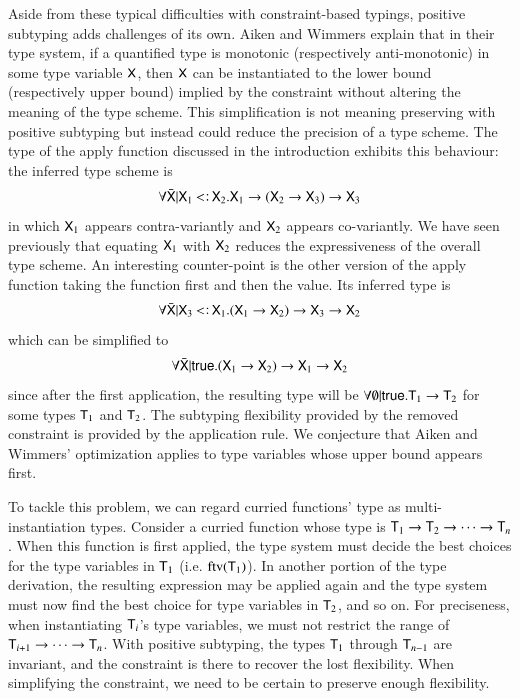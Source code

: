 \documentclass{report}
\begin{document}
  Aside from these typical difficulties with constraint-based typings, positive
  subtyping adds challenges of its own. Aiken and Wimmers \cite{aiken:ticti}
  explain that in their type system, if a quantified type is monotonic
  (respectively anti-monotonic) in some type variable $\textsf{X}$, then
  $\textsf{X}$ can be instantiated to the lower bound (respectively upper bound)
  implied by the constraint without altering the meaning of the type scheme.
  This simplification is not meaning preserving with positive subtyping but
  instead could reduce the precision of a type scheme. The type of the
  apply function discussed in the introduction exhibits this behaviour:
  the inferred type scheme is
  \begin{displaymath}
    \forall\bar{\type{X}}|\type{X}_1\subtype\type{X}_2.\type{X}_1\fun(\type{X}_2\fun\type{X}_3)\fun\type{X}_3
  \end{displaymath}
  in which $\textsf{X}_1$ appears contra-variantly and $\textsf{X}_2$ appears co-variantly.
  We have seen previously that equating $\textsf{X}_1$ with $\textsf{X}_2$
  reduces the expressiveness of the overall type scheme. An interesting counter-point is the
  other version of the apply function taking the function first and then the value.
  Its inferred type is
  \begin{displaymath}
    \forall\bar{\type{X}}|\type{X}_3\subtype\type{X}_1.(\type{X}_1\fun\type{X}_2)\fun\type{X}_3\fun\type{X}_2
  \end{displaymath}
  which can be simplified to
  \begin{displaymath}
    \forall\bar{\textsf{X}}|\textsf{true}.(\textsf{X}_1\rightarrow\textsf{X}_2)\rightarrow\textsf{X}_1\rightarrow\textsf{X}_2
  \end{displaymath}
  since after the first application, the resulting type will be
  $\forall\emptyset|\textsf{true}.\textsf{T}_1\rightarrow\textsf{T}_2$ for some types $\textsf{T}_1$ and
  $\textsf{T}_2$. The subtyping flexibility provided by the removed constraint
  is provided by the application rule. We conjecture that Aiken and Wimmers' optimization applies
  to type variables whose upper bound appears first.
  
  To tackle this problem, we can regard curried functions' type as multi-instantiation types.
  Consider a curried function whose type is $\textsf{T}_1\rightarrow\textsf{T}_2\rightarrow\cdots\rightarrow\textsf{T}_n$.
  When this function is first applied, the type system must decide
  the best choices for the type variables in $\textsf{T}_1$ (i.e. $\mathop{\rm ftv}\nolimits(\textsf{T}_1)$).
  In another portion of the type derivation, the resulting expression may be applied again
  and the type system must now find the best choice for type variables in $\textsf{T}_2$,
  and so on. For preciseness, when instantiating $\textsf{T}_i$'s type variables,
  we must not restrict the range of $\textsf{T}_{i+1}\rightarrow\cdots\rightarrow\textsf{T}_n$.
  With positive subtyping, the types $\textsf{T}_1$ through $\textsf{T}_{n-1}$ are invariant,
  and the constraint is there to recover the lost flexibility. When simplifying the
  constraint, we need to be certain to preserve enough flexibility.
  
\end{document}
